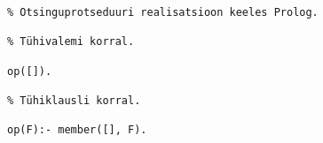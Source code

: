 \begin{verbatim}
% Otsinguprotseduuri realisatsioon keeles Prolog.

% Tühivalemi korral.

op([]).

% Tühiklausli korral.

op(F):- member([], F).


\end{verbatim}
